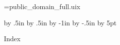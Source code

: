 








\openout\index=public_domain_full.uix











\begingroup
\advance\voffset by .5in
\advance\hoffset by .5in
\advance\hsize by -1in
\advance\vsize by -.5in
\advance\baselineskip by 5pt
\centerline{{\largebx Index}}
\baselineskip

\vfil\eject
\endgroup

\closeout\index

\Copying
\bye


